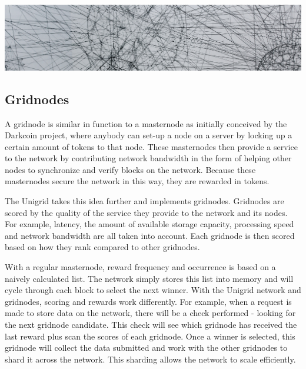 \documentclass[a4paper,oneside]{article}
\begin{document}
\begin{mdframed}[style=textimage]
	\includegraphics[width=381pt]{communication}
\end{mdframed}

\subsection{Gridnodes}
A gridnode is similar in function to a masternode as initially conceived by the Darkcoin project, where anybody can set-up a node on a server by locking up a certain amount of tokens to that node. These masternodes then provide a service to the network by contributing network bandwidth in the form of helping other nodes to synchronize and verify blocks on the network. Because these masternodes secure the network in this way, they are rewarded in tokens.

The Unigrid takes this idea further and implements gridnodes. Gridnodes are scored by the quality of the service they provide to the network and its nodes. For example, latency, the amount of available storage capacity, processing speed and network bandwidth are all taken into account. Each gridnode is then scored based on how they rank compared to other gridnodes.

With a regular masternode, reward frequency and occurrence is based on a naively calculated list. The network simply stores this list into memory and will cycle through each block to select the next winner. With the Unigrid network and gridnodes, scoring and rewards work differently. For example, when a request is made to store data on the network, there will be a check performed - looking for the next gridnode candidate. This check will see which gridnode has received the last reward plus scan the scores of each gridnode. Once a winner is selected, this gridnode will collect the data submitted and work with the other gridnodes to shard it across the network. This sharding allows the network to scale efficiently.
\end{document}
